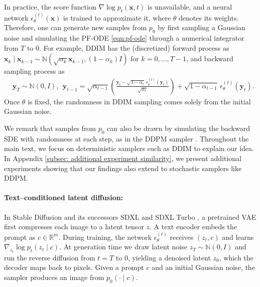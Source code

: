 \documentclass[12pt]{article}
\newcommand{\y}{\mathbf{y}}
\newcommand{\x}{\mathbf{x}}
\newcommand{\0}{\mathbf{0}}
\newcommand{\bN}{\mathbb{N}}
\begin{document}
In practice, the score function $\nabla \log p_t (\x,  t)$ is unavailable, and a neural network $\epsilon_{\theta}^{(t)}(\x)$ is trained to approximate it, where $\theta$ denotes its weights. Therefore, one can generate new samples from $p_0$ by first sampling a Gaussian noise and simulating the PF-ODE \eqref{eqn:pf-ode} through a numerical integrator from $T$ to $0$. For example, DDIM \citep{songj2021denoising} has the (discretized) forward process as $\x_{k}\mid \x_{k-1}\sim \bN(\sqrt{\alpha_k}\x_{k-1}, (1-\alpha_k)I)$ for $k = 0,  \ldots, T-1$, and backward sampling process as 
\begin{equation}\label{eqn:DDIM}
\begin{aligned}
    & \y_T \sim \bN(0, I), ~~\y_{t-1} = \sqrt{\alpha_{t-1}} 
\left(
\frac{\y_t - \sqrt{1-\alpha_t} \, \epsilon_{\theta}^{(t)}(\y_t)}{\sqrt{\alpha_t}}
\right) 
 + \sqrt{1-\alpha_{t-1}} \, \epsilon_{\theta}^{(t)}(\y_t).
\end{aligned}
\end{equation}
Once $\theta$ is fixed, the randomness in DDIM sampling comes solely from the initial Gaussian noise.  


We remark that samples from $p_0$
  can also be drawn by simulating the backward SDE with randomness at each step, as in the DDPM sampler \citep{ho2020denoising,song2021scorebased}.  Throughout the main text, we focus on deterministic samplers such as DDIM to explain our idea. In Appendix \ref{subsec: additional experiment similarity}, we present additional experiments showing that our findings also extend to stochastic samplers like DDPM.


\paragraph{Text–conditioned latent diffusion:}  
In Stable Diffusion and its successors SDXL and SDXL Turbo \citep{podell2024sdxl, sauer2024adversarial}, a pretrained VAE first compresses each image to a latent tensor $z$. A  text encoder embeds the prompt as $c \in\mathbb{R}^m$.
During training, the network $\epsilon_{\theta}^{(t)}$ receives $(z_t,c)$ and learns $\nabla_{z_t}\log p_t(z_t\mid c)$.
At generation time we draw latent noise $z_T\sim\bN(0,I)$ and run the reverse diffusion from $t=T$ to $0$, yielding a denoised latent $z_0$, which the decoder maps back to pixels.
Given a prompt $c$ and an initial Gaussian noise, the sampler  produces an image from $p_0(\cdot\mid c)$.
\end{document}
